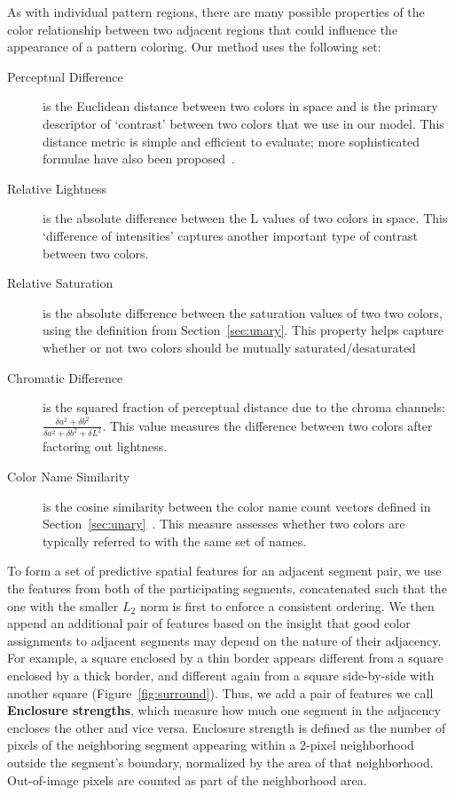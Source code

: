 As with individual pattern regions, there are many possible properties of the color relationship between two adjacent regions that could influence the appearance of a pattern coloring. Our method uses the following set:
\begin{description}
	\item[Perceptual Difference] is the Euclidean distance between two colors in \lab space and is the primary descriptor of `contrast' between two colors that we use in our model. This distance metric is simple and efficient to evaluate; more sophisticated formulae have also been proposed~\cite{CIEDE2000}.
	\item[Relative Lightness] is the absolute difference between the L values of two colors in \lab space. This `difference of intensities' captures another important type of contrast between two colors.
	\item[Relative Saturation] is the absolute difference between the saturation values of two two colors, using the definition from Section~\ref{sec:unary}. This property helps capture whether or not two colors should be mutually saturated/desaturated
	\item[Chromatic Difference] is the squared fraction of perceptual distance due to the \lab chroma channels: $\frac{\delta a^2+\delta b^2}{\delta a^2+\delta b^2+\delta L^2}$. This value measures the difference between two colors after factoring out lightness.
	\item[Color Name Similarity] is the cosine similarity between the color name count vectors defined in Section~\ref{sec:unary}~\cite{ColorNamingModels}. This measure assesses whether two colors are typically referred to with the same set of names.
\end{description}
To form a set of predictive spatial features for an adjacent segment pair, we use the features from both of the participating segments, concatenated such that the one with the smaller $L_2$ norm is first to enforce a consistent ordering. We then append an additional pair of features based on the insight that good color assignments to adjacent segments may depend on the nature of their adjacency. For example, a square enclosed by a thin border appears different from a square enclosed by a thick border, and different again from a square side-by-side with another square (Figure~\ref{fig:surround}). Thus, we add a pair of features we call \textbf{Enclosure strengths}, which measure how much one segment in the adjacency encloses the other and vice versa. Enclosure strength is defined as the number of pixels of the neighboring segment appearing within a 2-pixel neighborhood outside the segment's boundary, normalized by the area of that neighborhood. Out-of-image pixels are counted as part of the neighborhood area.


